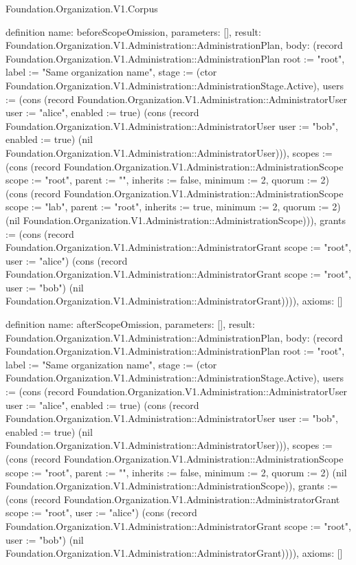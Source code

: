 \begin{lexlean}{Foundation.Organization.V1.Corpus}
\begin{semanticmodule}
definition{
  name: beforeScopeOmission,
  parameters: [],
  result: Foundation.Organization.V1.Administration::AdministrationPlan,
  body: (record Foundation.Organization.V1.Administration::AdministrationPlan {root := "root", label := "Same organization name", stage := (ctor Foundation.Organization.V1.Administration::AdministrationStage.Active), users := (cons (record Foundation.Organization.V1.Administration::AdministratorUser {user := "alice", enabled := true}) (cons (record Foundation.Organization.V1.Administration::AdministratorUser {user := "bob", enabled := true}) (nil Foundation.Organization.V1.Administration::AdministratorUser))), scopes := (cons (record Foundation.Organization.V1.Administration::AdministrationScope {scope := "root", parent := "", inherits := false, minimum := 2, quorum := 2}) (cons (record Foundation.Organization.V1.Administration::AdministrationScope {scope := "lab", parent := "root", inherits := true, minimum := 2, quorum := 2}) (nil Foundation.Organization.V1.Administration::AdministrationScope))), grants := (cons (record Foundation.Organization.V1.Administration::AdministratorGrant {scope := "root", user := "alice"}) (cons (record Foundation.Organization.V1.Administration::AdministratorGrant {scope := "root", user := "bob"}) (nil Foundation.Organization.V1.Administration::AdministratorGrant)))}),
  axioms: []
}

definition{
  name: afterScopeOmission,
  parameters: [],
  result: Foundation.Organization.V1.Administration::AdministrationPlan,
  body: (record Foundation.Organization.V1.Administration::AdministrationPlan {root := "root", label := "Same organization name", stage := (ctor Foundation.Organization.V1.Administration::AdministrationStage.Active), users := (cons (record Foundation.Organization.V1.Administration::AdministratorUser {user := "alice", enabled := true}) (cons (record Foundation.Organization.V1.Administration::AdministratorUser {user := "bob", enabled := true}) (nil Foundation.Organization.V1.Administration::AdministratorUser))), scopes := (cons (record Foundation.Organization.V1.Administration::AdministrationScope {scope := "root", parent := "", inherits := false, minimum := 2, quorum := 2}) (nil Foundation.Organization.V1.Administration::AdministrationScope)), grants := (cons (record Foundation.Organization.V1.Administration::AdministratorGrant {scope := "root", user := "alice"}) (cons (record Foundation.Organization.V1.Administration::AdministratorGrant {scope := "root", user := "bob"}) (nil Foundation.Organization.V1.Administration::AdministratorGrant)))}),
  axioms: []
}


\end{semanticmodule}
\end{lexlean}

